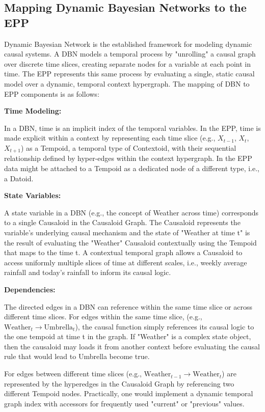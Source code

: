%
%
\subsection{Mapping Dynamic Bayesian Networks to the EPP}
\label{sec:epp_Dynamic_Bayesian_Networks}

Dynamic Bayesian Network is the established framework for modeling dynamic causal systems. A DBN models a temporal process by "unrolling" a causal graph over discrete time slices, creating separate nodes for a variable at each point in time. The EPP represents this same process   by evaluating a single, static causal model over a dynamic, temporal context hypergraph. The mapping of DBN to EPP components is as follows:
 
 \textbf{Time Modeling:}
 
 In a DBN, time is an implicit index of the temporal variables. In the EPP, time is made explicit within a
 context by representing each time slice (e.g., $X_{t-1}$, $X_t$, $X_{t+1}$) as a Tempoid, a temporal type of Contextoid, with their sequential relationship defined by hyper-edges within the context hypergraph. In the EPP data might be attached to a Tempoid as a dedicated node of a different type, i.e., a Datoid. 

 \textbf{State Variables:}
 
A state variable in a DBN (e.g., the concept of Weather across time) corresponds to a single Causaloid in the Causaloid Graph. The Causaloid represents the variable's underlying causal mechanism and the state of "Weather at time t" is the result of evaluating the "Weather" Causaloid contextually using the Tempoid that maps to the time t. A contextual temporal graph allows a Causaloid to access uniformly multiple slices of time at different scales, i.e., weekly average rainfall and today's rainfall to inform its causal logic. 

\textbf{Dependencies:}

The directed edges in a DBN can reference within the same time slice or across different time slices.
For edges within the same time slice, (e.g., $\text{Weather}_t \to \text{Umbrella}_t$), the causal function simply references its causal logic to the one tempoid at time t in the graph. If "Weather" is a complex state object, then the causaloid may loads it from another context before evaluating the causal rule that would lead to Umbrella become true.

For edges between different time slices (e.g., $\text{Weather}_{t-1} \to \text{Weather}_t$) are represented by the hyperedges in the Causaloid Graph by referencing two different Tempoid nodes. Practically, one would implement a dynamic temporal graph index with accessors for frequently used "current" or "previous" values. 


